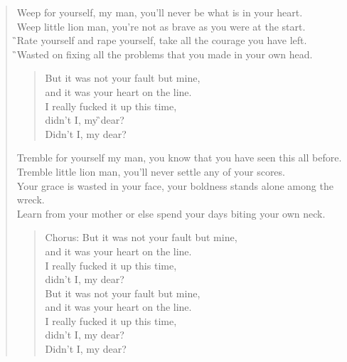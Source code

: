 \documentclass[9pt,a4paper,oneside, onecolumn]{article}
\begin{document}
\begin{verse}
\Am{}Weep for yourself, my man,
you'll never be what is in your \C{}heart.\\
\Am{}Weep little lion man,
you're not as brave as you were at the \C{}start.\\
\G{}Rate yourself and rape yourself,
\F{}take all the \Fmajs{}courage you have \C{}left.\\
\G{}Wasted on fixing all the
\F{}problems that you \Fmajs{}made in your own \C{}head.\\

\begin{verse}
But it was \Am{}not your \F{}fault but \C{}mine,\\
and it was \Am{}your heart \F{}on the \C{}line.\\
I really \Am{}fucked it \F{}up this \C{}time,\\
didn't I, my \G{}dear?\\
Didn't I, my dear?\Am{}\\
\end{verse}

\qquad{}\qquad{}\qquad{}


Tremble for yourself my man,
you know that you have seen this all before.\\
Tremble little lion man,
you'll never settle any of your scores.\\
Your grace is wasted in your face,
your boldness stands alone among the wreck.\\
Learn from your mother or else
spend your days biting your own neck.\\

\begin{verse}
Chorus:
But it was not your fault but mine,\\
and it was your heart on the line.\\
I really fucked it up this time,\\
didn't I, my dear?\\
But it was not your fault but mine,\\
and it was your heart on the line.\\
I really fucked it up this time,\\
didn't I, my dear?\\
Didn't I, my dear?\\
\end{verse}

\qquad{}\qquad{}\qquad{}



\end{verse}
\end{document}
